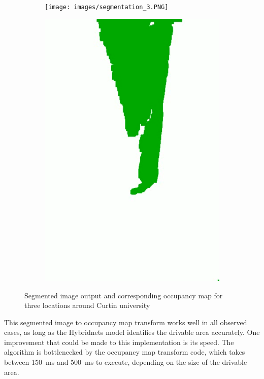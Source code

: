 \begin{figure}[b]
\begin{subfigure}{.24\textwidth}
    \end{subfigure}
    \begin{subfigure}{.64\textwidth}
        \centering
        \texttt{[image: images/segmentation\_3.PNG]}
    \end{subfigure}
    \quad
    \begin{subfigure}{.24\textwidth}
        \centering
        \includegraphics[width=\linewidth]{images/occupancy_map3.png}
    \end{subfigure}
    \caption{Segmented image output and corresponding occupancy map for three locations around Curtin university}
    \label{fig:occupancy_map_seg}
\end{figure}

This segmented image to occupancy map transform works well in all observed cases, as long as the Hybridnets model identifies the
drivable area accurately. One improvement that could be made to this implementation is its speed.
The algorithm is bottlenecked by the occupancy map transform code, which takes between \SI{150}{\milli\second}
and \SI{500}{\milli\second} to execute, depending on the size of the drivable area.


